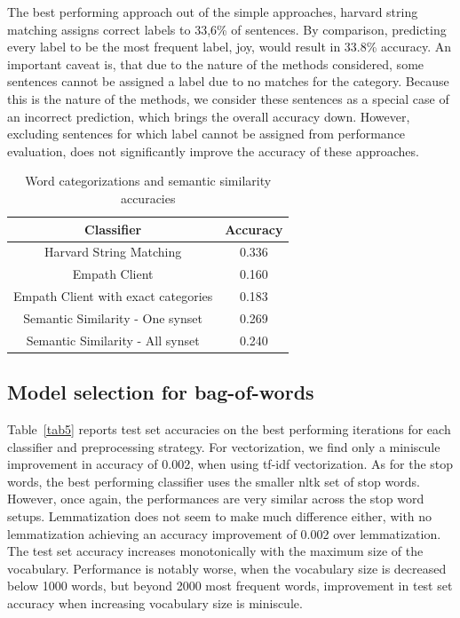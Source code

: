 \documentclass[conference]{IEEEtran}
\begin{document}
The best performing approach out of the simple approaches, harvard string matching assigns correct labels to 33,6\% of sentences. By comparison, predicting every label to be the most frequent label, joy, would result in 33.8\% accuracy. An important caveat is, that due to the nature of the methods considered, some sentences cannot be assigned a label due to no matches for the category. Because this is the nature of the methods, we consider these sentences as a special case of an incorrect prediction, which brings the overall accuracy down. However, excluding sentences for which label cannot be assigned from performance evaluation, does not significantly improve the accuracy of these approaches.

\begin{table}[htbp]
\caption{Word categorizations and semantic similarity accuracies}
\begin{center}
\begin{tabular}{|c|c|}
\hline
\textbf{Classifier}&\multicolumn{1}{|c|}{\textbf{Accuracy}} \\ 

\hline
Harvard String Matching & 0.336 \\ 
\hline
Empath Client & 0.160 \\ 
\hline
Empath Client with exact categories & 0.183 \\ 
\hline
Semantic Similarity - One synset & 0.269 \\ 
\hline
Semantic Similarity - All synset & 0.240 \\ 
\hline
\end{tabular}
\label{tab1}
\end{center}
\end{table}

\subsection{Model selection for bag-of-words}

Table~\ref{tab5} reports test set accuracies on the best performing iterations for each classifier and preprocessing strategy. For vectorization, we find only a miniscule improvement in accuracy of 0.002, when using tf-idf vectorization. As for the stop words, the best performing classifier uses the smaller nltk set of stop words. However, once again, the  performances are very similar across the stop word setups. Lemmatization does not seem to make much difference either, with no lemmatization achieving an accuracy improvement of 0.002 over lemmatization. The test set accuracy increases monotonically with the maximum size of the vocabulary. Performance is notably worse, when the vocabulary size is decreased below 1000 words, but beyond 2000 most frequent words, improvement in test set accuracy when increasing vocabulary size is miniscule.
\end{document}
